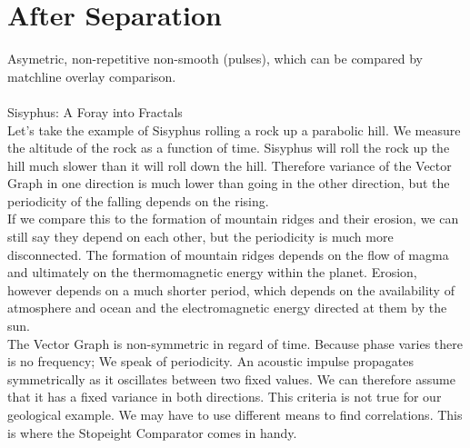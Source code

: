 \documentclass{report}
\begin{document}
\chapter{After Separation}
Asymetric, non-repetitive non-smooth (pulses), which can be compared by matchline overlay comparison.\\\\
Sisyphus: A Foray into Fractals\\
Let's take the example of Sisyphus rolling a rock up a parabolic hill. We measure the altitude of the rock as a function of time. Sisyphus will roll the rock up the hill much slower than it will roll down the hill. Therefore variance of the Vector Graph in one direction is much lower than going in the other direction, but the periodicity of the falling depends on the rising.\\
If we compare this to the formation of mountain ridges and their erosion, we can still say they depend on each other, but the periodicity is much more disconnected. The formation of mountain ridges depends on the flow of magma and ultimately on the thermomagnetic energy within the planet. Erosion, however depends on a much shorter period, which depends on the availability of atmosphere and ocean and the electromagnetic energy directed at them by the sun.\\
The Vector Graph is non-symmetric in regard of time. Because phase varies there is no frequency; We speak of periodicity. An acoustic impulse propagates symmetrically as it oscillates between two fixed values. We can therefore assume that it has a fixed variance in both directions. This criteria is not true for our geological example. We may have to use different means to find correlations. This is where the Stopeight Comparator comes in handy.\\


\iffalse
\printbibliography
\fi
{}

\end{document}
